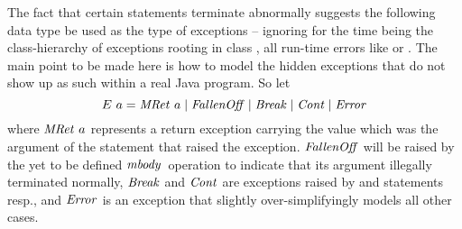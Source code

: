 The fact that certain statements terminate abnormally suggests the following
data type be used as the type of exceptions -- ignoring for the time being the
class-hierarchy of exceptions rooting in class , \IE all
run-time errors like  or
. The main point to be made here is how to model the hidden
exceptions that do not show up as such within a real Java program. So let
\[
E\ a = \mathit{MRet}\ a \;|\; \mathit{FallenOff} \;|\; \mathit{Break} \;|\; \mathit{Cont} \;|\; \mathit{Error}
\]
where $\mathit{MRet}\ a$ represents a return exception carrying the value
which was the argument of the  statement that raised the exception.
$\mathit{FallenOff}$ will be raised by the yet to be defined $\mathit{mbody}\,$ operation to
indicate that its argument illegally terminated normally, $\mathit{Break}$ and
$\mathit{Cont}$ are exceptions raised by  and  statements
resp., and $\mathit{Error}$ is an exception that slightly over-simplifyingly models
all other cases.
 
